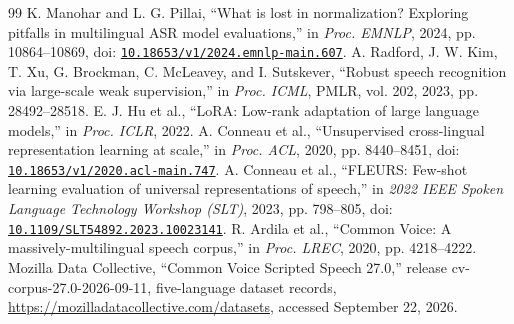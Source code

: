 \documentclass{article}
\begin{document}
\begin{thebibliography}{99}
 K. Manohar and L. G. Pillai, ``What is lost in normalization? Exploring pitfalls in multilingual ASR model evaluations,'' in \emph{Proc. EMNLP}, 2024, pp. 10864--10869, doi: \href{https://doi.org/10.18653/v1/2024.emnlp-main.607}{\nolinkurl{10.18653/v1/2024.emnlp-main.607}}.
 A. Radford, J. W. Kim, T. Xu, G. Brockman, C. McLeavey, and I. Sutskever, ``Robust speech recognition via large-scale weak supervision,'' in \emph{Proc. ICML}, PMLR, vol. 202, 2023, pp. 28492--28518.
 E. J. Hu et al., ``LoRA: Low-rank adaptation of large language models,'' in \emph{Proc. ICLR}, 2022.
 A. Conneau et al., ``Unsupervised cross-lingual representation learning at scale,'' in \emph{Proc. ACL}, 2020, pp. 8440--8451, doi: \href{https://doi.org/10.18653/v1/2020.acl-main.747}{\nolinkurl{10.18653/v1/2020.acl-main.747}}.
 A. Conneau et al., ``FLEURS: Few-shot learning evaluation of universal representations of speech,'' in \emph{2022 IEEE Spoken Language Technology Workshop (SLT)}, 2023, pp. 798--805, doi: \href{https://doi.org/10.1109/SLT54892.2023.10023141}{\nolinkurl{10.1109/SLT54892.2023.10023141}}.
 R. Ardila et al., ``Common Voice: A massively-multilingual speech corpus,'' in \emph{Proc. LREC}, 2020, pp. 4218--4222.
 Mozilla Data Collective, ``Common Voice Scripted Speech 27.0,'' release cv-corpus-27.0-2026-09-11, five-language dataset records, \url{https://mozilladatacollective.com/datasets}, accessed September 22, 2026.
\end{thebibliography}
\end{document}

